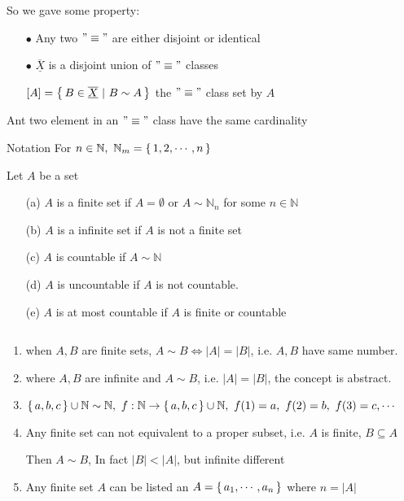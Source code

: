 So we gave some property:

\begin{enumerate}
	\item[$\bullet$] Any two $"\equiv"$ are either disjoint or identical 
	\item[$\bullet$] $\overline{\underline{X}}$ is a disjoint union of $"\equiv "$ classes
	
	$[A] = \left\{ \,B \in \overline{\underline{X}}~|~B \sim A \,\right\}$ the $"\equiv "$ class set by $A$
\end{enumerate}

Ant two element in an $"\equiv "$ class have the same cardinality

Notation For $n \in \mathbb N,~\mathbb N_{m} = \left\{ \,1,2,\cdots,n \,\right\}$

\begin{defn}
	Let $A$ be a set
	
	\begin{enumerate}
		\item[(a)] $A$ is a finite set if $A = \emptyset$ or $A \sim \mathbb N_n$ for some $n \in \mathbb N$
		\item[(b)] $A$ is a infinite set if $A$ is not a finite set 
		\item[(c)] $A$ is countable if $A \sim \mathbb N$
		\item[(d)] $A$ is uncountable if $A$ is not countable.
		\item[(e)] $A$ is at most countable if $A$ is finite or countable
	\end{enumerate}
\end{defn}

\newpage

\begin{rmk*} $ $
	\begin{enumerate}
		\item when $A,B$ are finite sets, $A \sim B \Leftrightarrow |A| = |B|$, i.e. $A,B$ have same number.
		\item where $A,B$ are infinite and $A \sim B$, i.e. $|A| = |B|$, the concept is abstract.
		\item $\left\{ \,a,b,c \,\right\} \cup \mathbb N \sim \mathbb N,~f:\mathbb N \rightarrow \left\{ \,a,b,c \,\right\} \cup \mathbb N,~f(1) = a,~f(2) = b,~f(3) = c,\cdots$
		\item Any finite set can not equivalent to a proper subset, i.e. $A$ is finite, $B \subseteq A$
		
		Then $A \sim B$, In fact $|B| < |A|$, but infinite different
		\item Any finite set $A$ can be listed an $A = \left\{ \,a_1,\cdots,a_n \,\right\}$ where $n = |A|$
	\end{enumerate}
\end{rmk*}

